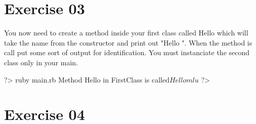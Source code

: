 \documentclass{42-en}
\begin{document}


\chapter{Exercise 03}


\makeheaderfiles

You now need to create a method inside your first class called Hello which will take the name from the constructor and print out "Hello ". When the method is call put some sort of output for identification. You must instanciate the second class only in your main.

\begin{42console}
	?> ruby main.rb
	Method Hello in FirstClass is called$
	Hello mlu$
	?>
\end{42console}


\chapter{Exercise 04}

\end{document}
